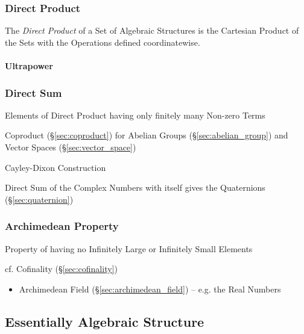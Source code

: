 \subsubsection{Direct Product}\label{sec:direct_product}

The \emph{Direct Product} of a Set of Algebraic Structures is the
Cartesian Product of the Sets with the Operations defined
coordinatewise.



\paragraph{Ultrapower}\label{sec:ultrapower}\hfill



\subsubsection{Direct Sum}\label{sec:direct_sum}

Elements of Direct Product having only finitely many Non-zero Terms

Coproduct (\S\ref{sec:coproduct}) for Abelian Groups
(\S\ref{sec:abelian_group}) and Vector Spaces
(\S\ref{sec:vector_space})

Cayley-Dixon Construction

Direct Sum of the Complex Numbers with itself gives the Quaternions
(\S\ref{sec:quaternion})



\subsubsection{Archimedean Property}\label{sec:archimedean_property}

Property of having no Infinitely Large or Infinitely Small Elements

cf. Cofinality (\S\ref{sec:cofinality})

\begin{itemize}
  \item Archimedean Field (\S\ref{sec:archimedean_field}) -- e.g. the Real
    Numbers
\end{itemize}



\subsection{Essentially Algebraic Structure}
\label{sec:essentially_algebraic}

